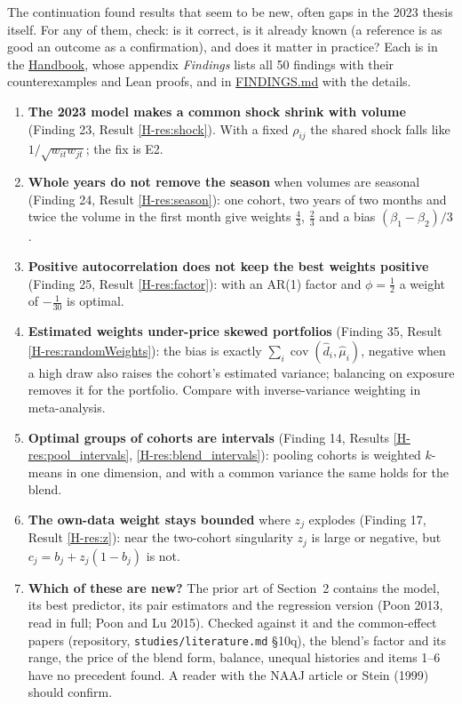 \documentclass[10pt]{article}
\newcommand{\site}{https://mikaelandblom-coder.github.io/credible-lean/}
\newcommand{\repo}{https://github.com/mikaelandblom-coder/credible-lean}
\newcommand{\hb}[1]{\ref*{H-#1}}
\newcommand{\Handbook}{\href{\site handbook.pdf}{Handbook}}
\newcommand{\hmu}{\hat\mu}
\newcommand{\cov}{\operatorname{cov}}
\begin{document}
The continuation found results that seem to be new, often gaps in the 2023 thesis itself. For any
of them, check: is it correct, is it already known (a reference is as good an outcome as a
confirmation), and does it matter in practice? Each is in the \Handbook{}, whose appendix \emph{Findings} lists all 50 findings with their
counterexamples and Lean proofs, and in \href{\repo/blob/main/FINDINGS.md}{FINDINGS.md} with the
details.
\begin{enumerate}\setlength{\itemsep}{1pt}
  \item \textbf{The 2023 model makes a common shock shrink with volume} (Finding 23, Result
    \hb{res:shock}). With a fixed $\rho_{ij}$ the shared shock falls like $1/\sqrt{w_{it}w_{jt}}$;
    the fix is E2.
  \item \textbf{Whole years do not remove the season} when volumes are seasonal (Finding 24,
    Result \hb{res:season}): one cohort, two years of two months and twice the volume in the
    first month give weights $\tfrac43$, $\tfrac23$ and a bias $(\beta_1 - \beta_2)/3$.
  \item \textbf{Positive autocorrelation does not keep the best weights positive} (Finding 25,
    Result \hb{res:factor}): with an AR(1) factor and $\phi = \tfrac12$ a weight of $-\tfrac1{30}$
    is optimal.
  \item \textbf{Estimated weights under-price skewed portfolios} (Finding 35, Result
    \hb{res:randomWeights}): the bias is exactly $\sum_i\cov(\hat d_i, \hmu_i)$, negative when a
    high draw also raises the cohort's estimated variance; balancing on exposure removes it for
    the portfolio. Compare with inverse-variance weighting in meta-analysis.
  \item \textbf{Optimal groups of cohorts are intervals} (Finding 14, Results
    \hb{res:pool_intervals}, \hb{res:blend_intervals}): pooling cohorts is weighted $k$-means in
    one dimension, and with a common variance the same holds for the blend.
  \item \textbf{The own-data weight stays bounded} where $z_j$ explodes (Finding 17, Result
    \hb{res:z}): near the two-cohort singularity $z_j$ is large or negative, but
    $c_j = b_j + z_j(1 - b_j)$ is not.
  \item \textbf{Which of these are new?} The prior art of Section~2 contains the model, its best
    predictor, its pair estimators and the regression version (Poon 2013, read in full; Poon and
    Lu 2015). Checked against it and the common-effect papers (repository,
    \texttt{studies/literature.md} §10q), the blend's factor and its range, the price of the blend
    form, balance, unequal histories and items 1--6 have no precedent found. A reader with the
    NAAJ article or Stein (1999) should confirm.
\end{enumerate}
\end{document}
